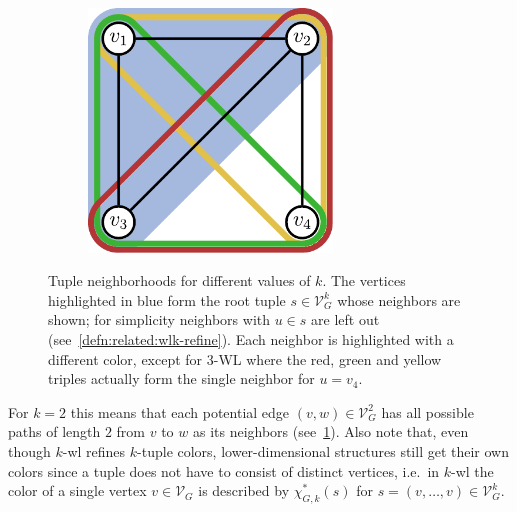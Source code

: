 \begin{figure}[ht]
\begin{subfigure}{0.32\textwidth}
		\label{fig:related:wl-neighbors:2}
	\end{subfigure}%
	\begin{subfigure}{0.36\textwidth}
		\centering
		\includegraphics[width=0.711\textwidth]{gfx/related-work/wl3-neighbors.pdf}
		\label{fig:related:wl-neighbors:3}
	\end{subfigure}
	\caption[\ac{wl} neighborhoods for different values of $k$.]{
		Tuple neighborhoods for different values of $k$.
		The vertices highlighted in \textcolor{t_blue}{blue} form the root tuple $s \in \mathcal{V}_G^k$ whose neighbors are shown;
		for simplicity neighbors with $u \in s$ are left out (see~\cref{defn:related:wlk-refine}).
		Each neighbor is highlighted with a different color, except for 3-WL where the \textcolor{t_red}{red}, \textcolor{t_darkgreen}{green} and \textcolor{t_darkyellow}{yellow} triples actually form the single neighbor for $u = v_4$.
	}\label{fig:related:wl-neighbors}
\end{figure}
For $k = 2$ this means that each potential edge $(v, w) \in \mathcal{V}_G^2$ has all possible paths of length $2$ from $v$ to $w$ as its neighbors (see~\cref{fig:related:wl-neighbors:2}).
Also note that, even though $k$-\acs{wl} refines $k$-tuple colors, lower-dimensional structures still get their own colors since a tuple does not have to consist of distinct vertices, i.e.\ in $k$-\acs{wl} the color of a single vertex $v \in \mathcal{V}_G$ is described by $\chi^{*}_{G, k}(s)$ for $s = (v, \dots, v) \in \mathcal{V}_G^k$.

